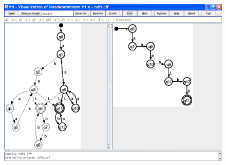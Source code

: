 \documentclass[11pt]{article}
\begin{document}
\begin{figure}[htbp]
\begin{center}
\includegraphics[width=.8\textwidth,keepaspectratio=true]{vn.png}
\end{center}
\end{figure}
 
\end{document}
